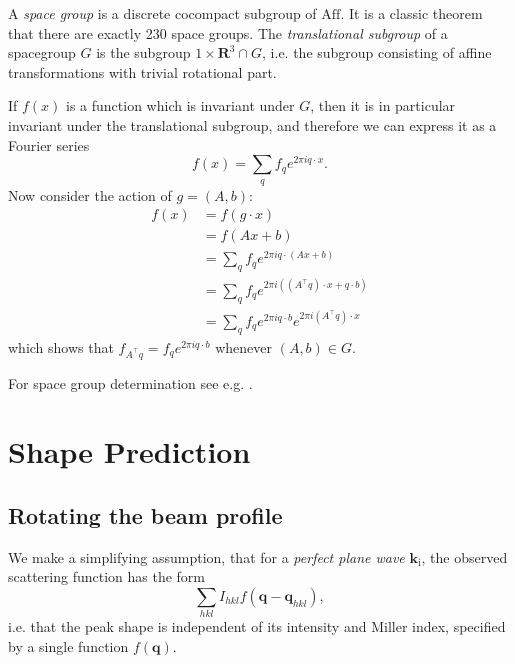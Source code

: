 \documentclass[11pt,a4paper]{article}
\def\v#1{\bm{{#1}}}
\def\tr{^\intercal}
\def\si{\text{i}}
\def\k{{\v{k}}}
\def\q{{\v{q}}}
\begin{document}
A \emph{space group} is a discrete cocompact subgroup of $\mathrm{Aff}$. It is a classic theorem that there are exactly 230 space groups.
The \emph{translational subgroup} of a spacegroup $G$ is the subgroup ${1} \times \mathbf{R}^3 \cap G$, i.e. the subgroup consisting of
affine transformations with trivial rotational part.

If $f(x)$ is a function which is invariant under $G$, then it
is in particular invariant under the translational subgroup, and therefore we can express it as a Fourier series
\begin{equation} f(x) = \sum_q f_q e^{2\pi i q \cdot x}. \end{equation}
Now consider the action of $g = (A,b)$:
\begin{align}
  f(x)
  &= f(g\cdot x) \\
  &= f(Ax + b) \\
  &= \sum_q f_q e^{2\pi i q \cdot (Ax + b)} \\
  &= \sum_q f_q e^{2\pi i ((A\tr q) \cdot x + q \cdot b)} \\
  &= \sum_q f_q e^{2 \pi i q \cdot b} e^{2\pi i (A\tr q) \cdot x}
\end{align}
which shows that $f_{A\tr q} = f_{q} e^{2 \pi i q \cdot b}$ whenever $(A,b) \in G$.

For space group determination see e.g. \cite{Eva11,Kab10b}.


\section{Shape Prediction} \label{peak-prediction}

\subsection{Rotating the beam profile}

We make a simplifying assumption, that for a \emph{perfect plane wave} $\k_\si$, the observed scattering function has the form
\begin{equation} \sum_{hkl} I_{hkl} f(\q - \q_{hkl}), \end{equation}
i.e. that the peak shape is independent of its intensity and Miller index, specified by a single function $f(\q)$.
\end{document}
